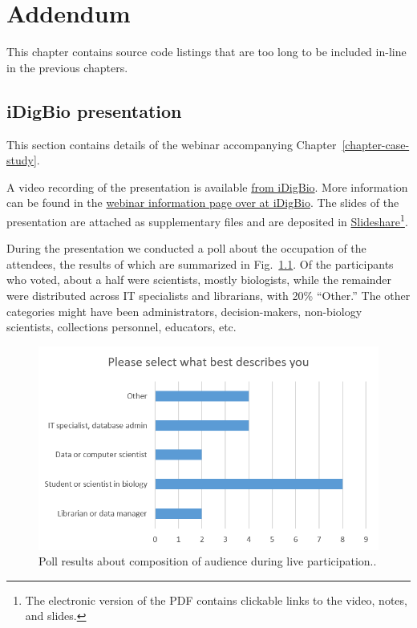 \chapter{Addendum} %
\label{chapter-addendum}

This chapter contains source code listings that are too long to be included in-line in the previous chapters.

\section{iDigBio presentation}

This section contains details of the webinar accompanying Chapter~\ref{chapter-case-study}.

A video recording of the presentation is available \href{http://idigbio.adobeconnect.com/p7sg0aym3e3/}{from iDigBio}. More information can be found in the \href{http://www.idigbio.org/content/online-direct-import-specimen-records-idigbio-infrastructure-taxonomic-manuscripts}{webinar information page over at iDigBio}. The slides of the presentation are attached as supplementary files and are deposited in \href{http://www.slideshare.net/ViktorSenderov/online-direct-import-of-specimen-records-from-idigbio-infrastructure-into-taxonomic-manuscripts}{Slideshare}\footnote{The electronic version of the PDF contains clickable links to the video, notes, and slides.}.

During the presentation we conducted a poll about the occupation of the attendees, the results of which are summarized in Fig.~\ref{fig:webinar-poll}. Of the participants who voted, about a half were scientists, mostly biologists, while the remainder were distributed across IT specialists and librarians, with 20\% ``Other.'' The other categories might have been administrators, decision-makers, non-biology scientists, collections personnel, educators, etc.

\begin{figure}
\centering
\includegraphics[width=\textwidth]{Figures/webinar-pool}
\decoRule
\caption{Poll results about composition of audience during live participation..}
\label{fig:webinar-poll}
\end{figure}

